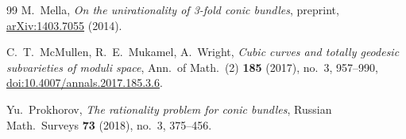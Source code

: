 \documentclass[11pt]{amsart}
\theoremstyle{definition}
\theoremstyle{remark}
\begin{document}
\begin{thebibliography}{99}
M.~Mella,
\emph{On the unirationality of 3-fold conic bundles}, preprint,
\href{https://arxiv.org/abs/1403.7055}{arXiv:1403.7055} (2014).

C.~T.~McMullen, R.~E.~Mukamel, A.~Wright,
\emph{Cubic curves and totally geodesic subvarieties of moduli space},
Ann.\ of Math.\ (2) \textbf{185} (2017), no.~3, 957--990,
\href{https://doi.org/10.4007/annals.2017.185.3.6}{doi:10.4007/annals.2017.185.3.6}.

Yu.~Prokhorov,
\emph{The rationality problem for conic bundles},
Russian Math.\ Surveys \textbf{73} (2018), no.~3, 375--456.

\end{thebibliography}
\end{document}
